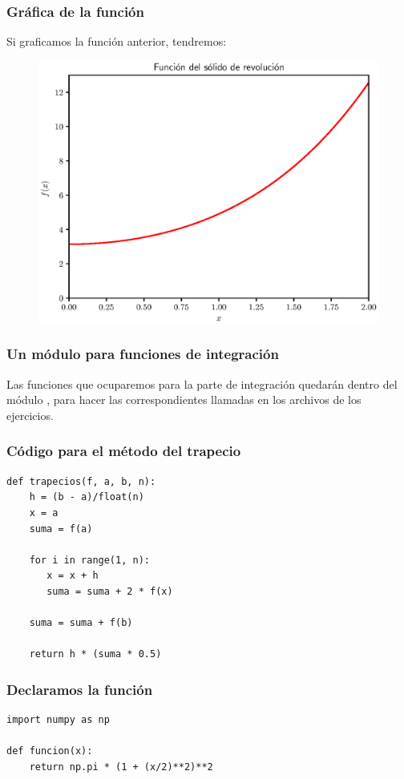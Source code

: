 \documentclass[12pt]{beamer}
\begin{document}
\begin{frame}
\frametitle{Gráfica de la función}
Si graficamos la función anterior, tendremos:
\begin{figure}
    \centering
    \includegraphics[scale=0.5]{Imagenes/integracion_ejercicio_solido_rev_01.eps}
\end{figure}
\end{frame}
\begin{frame}
\frametitle{Un módulo para funciones de integración}
Las funciones que ocuparemos para la parte de integración quedarán dentro del módulo , para hacer las correspondientes llamadas en los archivos de los ejercicios.
\end{frame}
\begin{frame}
\frametitle{Código para el método del trapecio}
\begin{lstlisting}[caption=Código para la función trapecios]
def trapecios(f, a, b, n):
    h = (b - a)/float(n)
    x = a
    suma = f(a)
    
    for i in range(1, n):
       x = x + h
       suma = suma + 2 * f(x)
    
    suma = suma + f(b)
    
    return h * (suma * 0.5)
\end{lstlisting}
\end{frame}
\begin{frame}[fragile]
\frametitle{Declaramos la función}
\begin{lstlisting}[caption=Código para la función f (x)]
import numpy as np

def funcion(x):
    return np.pi * (1 + (x/2)**2)**2
\end{lstlisting}
    \end{frame}
\end{document}
